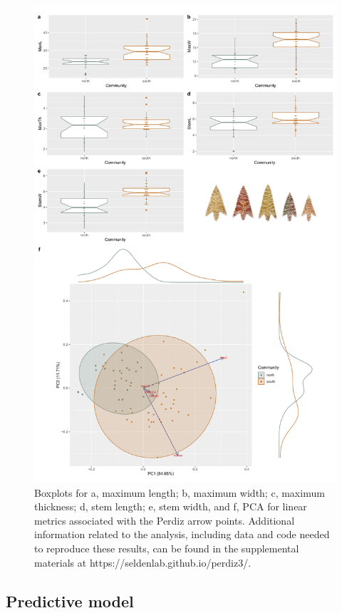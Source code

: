 \documentclass[smallextended]{svjour3}       %
\begin{document}
\begin{figure}
\includegraphics[width=0.95\linewidth]{ms-figs/figure2} \caption{Boxplots for a, maximum length; b, maximum width; c, maximum thickness; d, stem length; e, stem width, and f, PCA for linear metrics associated with the Perdiz arrow points. Additional information related to the analysis, including data and code needed to reproduce these results, can be found in the supplemental materials at https://seldenlab.github.io/perdiz3/.}\label{fig:fig2}
\end{figure}

\hypertarget{predictive-model}{%
\subsection{Predictive model}\label{predictive-model}}
\end{document}
